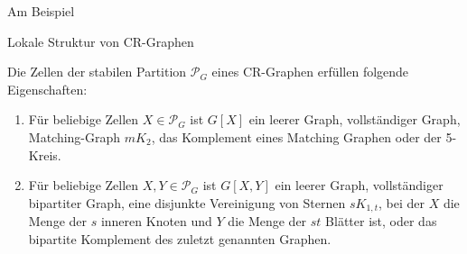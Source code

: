\documentclass{beamer}
\begin{document}
\begin{frame}{Am Beispiel }
	\end{frame}
	\begin{frame}{Lokale Struktur von CR-Graphen}
		\begin{Lemma}
			Die Zellen der stabilen Partition $\mathcal{P}_G$ eines CR-Graphen erfüllen folgende Eigenschaften:
			
			\begin{enumerate}[label=(\Alph*)]
				\item Für beliebige Zellen $X\in \mathcal{P}_G$ ist $G[X]$ ein leerer Graph, vollständiger Graph, Matching-Graph $mK_2$, das Komplement eines Matching Graphen oder der 5-Kreis.
				\item Für beliebige Zellen $X,Y\in \mathcal{P}_G$ ist $G[X,Y]$ ein leerer Graph, vollständiger bipartiter Graph, eine disjunkte Vereinigung von Sternen $sK_{1,t}$, bei der $X$ die Menge der $s$ inneren Knoten und $Y$ die Menge der $st$ Blätter ist, oder das bipartite Komplement des zuletzt genannten Graphen.
			\end{enumerate}
		\end{Lemma}
	\end{frame}
\end{document}

